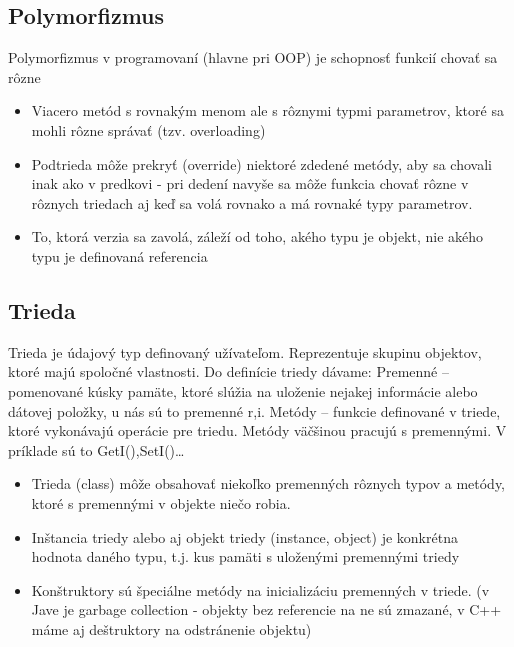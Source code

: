 	\subsection{Polymorfizmus}
		Polymorfizmus v programovaní (hlavne pri OOP) je schopnosť funkcií chovať sa rôzne
		\begin{itemize}
			\item Viacero metód s rovnakým menom ale s rôznymi typmi parametrov, ktoré sa mohli rôzne správať (tzv. overloading)

			\item Podtrieda môže prekryť (override) niektoré zdedené metódy, aby sa chovali inak ako v predkovi - pri dedení navyše sa môže funkcia chovať rôzne v rôznych triedach aj keď sa volá rovnako a má rovnaké typy parametrov.
			\item To, ktorá verzia sa zavolá, záleží od toho, akého typu je objekt, nie akého typu je definovaná referencia
		\end{itemize}

	\subsection{Trieda}
	Trieda je údajový typ definovaný užívateľom. Reprezentuje skupinu objektov, ktoré majú spoločné vlastnosti.
	Do definície triedy dávame: Premenné – pomenované kúsky pamäte, ktoré slúžia na uloženie nejakej informácie alebo dátovej položky, u nás sú to premenné r,i. Metódy – funkcie definované v triede, ktoré vykonávajú operácie pre triedu. Metódy väčšinou pracujú s premennými. V príklade sú to GetI(),SetI()…


		\begin{itemize}
			\item Trieda (class) môže obsahovať niekoľko premenných rôznych typov a metódy, ktoré s premennými v objekte niečo robia.
			\item Inštancia triedy alebo aj objekt triedy (instance, object) je konkrétna hodnota daného typu, t.j. kus pamäti s uloženými premennými triedy
			\item Konštruktory sú špeciálne metódy na inicializáciu premenných v triede. (v Jave je garbage collection - objekty bez referencie na ne sú zmazané, v C++ máme aj deštruktory na odstránenie objektu)
		\end{itemize}
